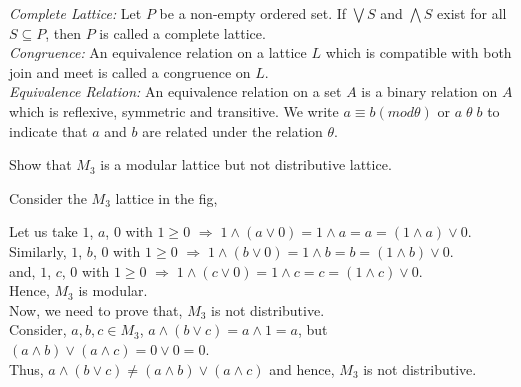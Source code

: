 \documentclass[12pt]{article}
\begin{document}
\begin{soln}
    \emph{Complete Lattice: } Let \(P\) be a non-empty ordered set. If \(\bigvee S\) and \(\bigwedge S\) exist for all \(S \subseteq P \), then \(P\) is called a complete lattice.\\

    \emph{Congruence: } An equivalence relation on a lattice \(L\) which is compatible with both join and meet is called a congruence on \(L\).\\

    \emph{Equivalence Relation:} An equivalence relation on a set \(A\) is a binary relation on \(A\) which is reflexive, symmetric and transitive. We write \(a \equiv b (mod \theta) \) or \(a\;\theta\;b\) to indicate that \(a\) and \(b\) are related under the relation \(\theta\).
\end{soln}
\begin{prob}
    Show that \(M_3\) is a modular lattice but not distributive lattice.
\end{prob}
\begin{soln}
    Consider the \(M_3\) lattice in the fig,
    \begin{center}
    \end{center}
    Let us take \(1\), \(a\), \(0\) with \(1\geq 0\) \(\Rightarrow\;1\wedge(a\vee 0)=1\wedge a=a=(1\wedge a)\vee 0\).\\
    Similarly, \(1\), \(b\), \(0\) with \(1\geq 0\) \(\Rightarrow\;1\wedge(b\vee 0)=1\wedge b=b=(1\wedge b)\vee 0\).\\
    and, \(1\), \(c\), \(0\) with \(1\geq 0\) \(\Rightarrow\;1\wedge(c\vee 0)=1\wedge c=c=(1\wedge c)\vee 0\).\\
    Hence, \(M_3\) is modular.\\
    Now, we need to prove that, \(M_3\) is not distributive.\\
    Consider, \(a,b,c\in M_3\), \(a\wedge(b\vee c)=a\wedge 1=a\), but \((a\wedge b)\vee (a\wedge c)=0\vee 0=0\).\\
    Thus, \(a\wedge (b\vee c)\neq (a\wedge b)\vee (a\wedge c)\) and hence, \(M_3\) is not distributive.
\end{soln}
\end{document}
